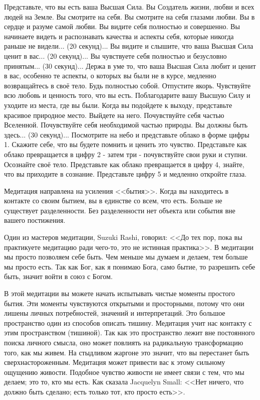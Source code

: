\documentclass[10pt, fleqn]{article}
\begin{document}
Представьте, что вы есть ваша Высшая Сила. Вы Создатель жизни, любви и всех людей на Земле. Вы смотрите на себя. Вы смотрите на себя глазами любви. Вы в сердце и разуме самой любви. Вы видите себя полностью и совершенно. Вы начинаете видеть и распознавать качества и аспекты себя, которые никогда раньше не видели... (20 секунд)... Вы видите и слышите, что ваша Высшая Сила ценит в вас... (20 секунд)... Вы чувствуете себя полностью и безусловно принятым... (30 секунд)... Держа в уме то, что ваша Высшая Сила любит и ценит в вас, особенно те аспекты, о которых вы были не в курсе, медленно возвращайтесь в своё тело. Будь полностью собой. Отпустите якорь. Чувствуйте всю любовь и ценность того, что вы есть. Поблагодарите вашу Высшую Силу и уходите из места, где вы были. Когда вы подойдете к выходу, представьте красивое природное место. Выйдете на него. Почувствуйте себя частью Вселенной. Почувствуйте себя необходимой частью природы. Вы должны быть здесь... (30 секунд)... Посмотрите на небо и представьте облако в форме цифры 1. Скажите себе, что вы будете помнить и ценить это чувство. Представьте как облако превращается в цифру 2 - затем три - почувствуйте свои руки и ступни. Осознайте своё тело. Представьте как облако превращается в цифру 4, знайте, что вы приходите в сознание. Представьте цифру 5 и медленно откройте глаза.


Медитация направлена на усиления <<бытия>>. Когда вы находитесь в контакте со своим бытием, вы в единстве со всем, что есть. Больше не существует разделенности. Без разделенности нет объекта или события вне вашего постижения.

Один из мастеров медитации, Suzuki Rashi, говорил: <<До тех пор, пока вы практикуете медитацию ради чего-то, это не истинная практика>>. В медитации мы просто позволяем себе быть. Чем меньше мы думаем и делаем, тем больше мы просто есть. Так как Бог, как я понимаю Бога, само бытие, то разрешить себе быть, значит войти в союз с Богом.

В этой медитации вы можете начать испытывать чистые моменты простого бытия. Эти моменты чувствуются открытыми и просторными, потому что они лишены личных потребностей, значений и интерпретаций. Это большое пространство один из способов описать тишину. Медитация учит нас контакту с этим пространством (тишиной). Так как это пространство лежит вне постоянного поиска личного смысла, оно может повлиять на радикальную трансформацию того, как мы живем. На стыдливом жаргоне это значит, что вы перестанет быть сверхнастороженным. Медитация может привести вас к этому сильному ощущению живости. Подобное чувство живости не имеет связи с тем, что мы делаем; это то, кто мы есть. Как сказала Jacquelyn Small: <<Нет ничего, что должно быть сделано; есть только тот, кто просто есть>>.
\end{document}
